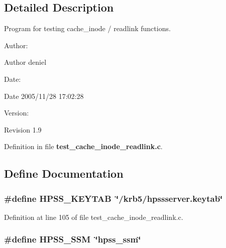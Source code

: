 \subsection{Detailed Description}
Program for testing cache\_\-inode / readlink functions. 

\begin{Desc}
\item[Author:]\end{Desc}
\begin{Desc}
\item[Author]deniel \end{Desc}
\begin{Desc}
\item[Date:]\end{Desc}
\begin{Desc}
\item[Date]2005/11/28 17:02:28 \end{Desc}
\begin{Desc}
\item[Version:]\end{Desc}
\begin{Desc}
\item[Revision]1.9 \end{Desc}


Definition in file {\bf test\_\-cache\_\-inode\_\-readlink.c}.

\subsection{Define Documentation}
\subsubsection[{HPSS\_\-KEYTAB}]{\setlength{\rightskip}{0pt plus 5cm}\#define HPSS\_\-KEYTAB~\char`\"{}/krb5/hpssserver.keytab\char`\"{}}\label{test__cache__inode__readlink_8c_547201ff2674f71edbe3ba4ec6296d93}




Definition at line 105 of file test\_\-cache\_\-inode\_\-readlink.c.
\subsubsection[{HPSS\_\-SSM}]{\setlength{\rightskip}{0pt plus 5cm}\#define HPSS\_\-SSM~\char`\"{}hpss\_\-ssm\char`\"{}}\label{test__cache__inode__readlink_8c_863b7cbf4c49b9bdda01992b993130a2}





